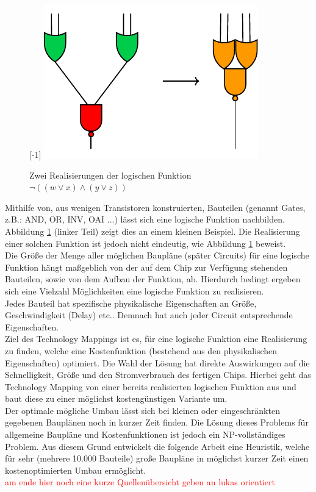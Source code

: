 \documentclass[11pt, a4paper, german]{article}
\newcommand{\TM}{Technology  Mapping }
\begin{document}
\begin{figure}
	\scalebox{1}[-1]{
		\includegraphics[]{pictures/compiled/einfBsp}
	}
		\caption{Zwei Realisierungen der logischen Funktion $\neg((w\lor x) \land (y \lor z))$}
		\label{bild:einfbsp}
\end{figure}
Mithilfe von, aus wenigen Transistoren konstruierten, Bauteilen (genannt Gates, z.B.: AND, OR, INV, OAI ...) lässt sich eine logische Funktion nachbilden. Abbildung \ref{bild:einfbsp} (linker Teil) zeigt dies an einem kleinen Beispiel.  Die Realisierung einer solchen Funktion ist jedoch nicht eindeutig, wie Abbildung \ref{bild:einfbsp}  beweist. \\
Die Größe der Menge aller möglichen Baupläne (später Circuits) für eine logische Funktion hängt maßgeblich von der auf dem Chip zur Verfügung stehenden Bauteilen, sowie von dem Aufbau der Funktion, ab. Hierdurch bedingt ergeben sich eine Vielzahl Möglichkeiten eine logische Funktion zu realisieren.\\
 Jedes Bauteil hat spezifische physikalische Eigenschaften an Größe, Geschwindigkeit (Delay) etc.. Demnach hat auch jeder Circuit entsprechende Eigenschaften. \\
Ziel des Technology Mappings ist es, für eine logische Funktion eine Realisierung zu finden, welche eine Kostenfunktion (bestehend aus den physikalischen Eigenschaften) optimiert. Die Wahl der Lösung hat direkte Auswirkungen auf die  Schnelligkeit, Größe und den Stromverbrauch des fertigen Chips. Hierbei geht das \TM von einer bereits realisierten logischen Funktion aus und baut diese zu einer möglichst kostengünstigen Variante um. \\
Der optimale mögliche Umbau lässt sich bei kleinen oder eingeschränkten gegebenen Bauplänen noch in kurzer Zeit finden. Die Lösung dieses Problems für allgemeine Baupläne und Kostenfunktionen ist jedoch ein NP-vollständiges Problem. Aus diesem Grund entwickelt die folgende Arbeit eine Heuristik, welche für sehr (mehrere 10.000 Bauteile) große Baupläne in möglichst kurzer Zeit einen kostenoptimierten Umbau ermöglicht.\\
\textcolor{red}{am ende hier noch eine kurze Quellenübersicht geben an lukas orientiert}
\end{document}
